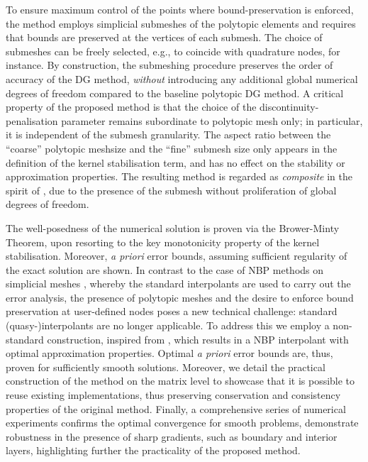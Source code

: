 \documentclass[11pt,final]{amsart}
\theoremstyle{plain}
\theoremstyle{definition}
\begin{document}
To ensure maximum control of the points where bound-preservation is enforced, the method employs simplicial submeshes of the polytopic elements and requires that bounds are preserved at the vertices of each submesh. The choice of submeshes can be freely selected, e.g., to coincide with quadrature nodes, for instance. By construction, the submeshing procedure preserves the order of accuracy of the DG method, \emph{without} introducing any additional global numerical degrees of freedom compared to the baseline polytopic DG method. A critical property of the proposed method is that the choice of the discontinuity-penalisation parameter remains subordinate to polytopic mesh only; in particular, it is independent of the submesh granularity. The aspect ratio between the ``coarse'' polytopic meshsize and the ``fine'' submesh size only appears in the definition of the kernel stabilisation term, and has no effect on the stability or approximation properties.  The resulting method is
regarded as \emph{composite} in the spirit of
\cite{HS97-Composite,HS97-Composite-II}, due to the presence of the submesh without proliferation of global degrees of freedom.

The well-posedness of the numerical solution is proven via the Brower-Minty Theorem, upon resorting to the key monotonicity property of the kernel stabilisation. Moreover, \emph{a priori} error bounds, assuming sufficient regularity of the exact solution are shown. In contrast to the case of NBP methods on simplicial meshes \cite{BGPV24, ABP24,DEW25}, whereby the standard interpolants are used to carry out the error analysis, the presence of polytopic meshes and the desire to enforce bound preservation at user-defined nodes poses a new technical challenge: standard %
(quasy-)interpolants are no longer applicable. To address this 
we employ a non-standard construction, inspired from \cite{mosco1974one,strang2006dimension,Kirby4755186}, which results in a NBP interpolant with optimal approximation properties. Optimal \emph{a priori} error bounds are, thus, proven for sufficiently smooth solutions. Moreover, we detail the practical construction of the method on the matrix level to showcase that it is possible to reuse existing implementations, thus preserving conservation and consistency properties of the original method. Finally, a comprehensive series of numerical experiments confirms the optimal convergence for
smooth problems, demonstrate robustness in the presence of sharp gradients, such as boundary
and interior layers, highlighting further the practicality of the proposed method. 
\end{document}

